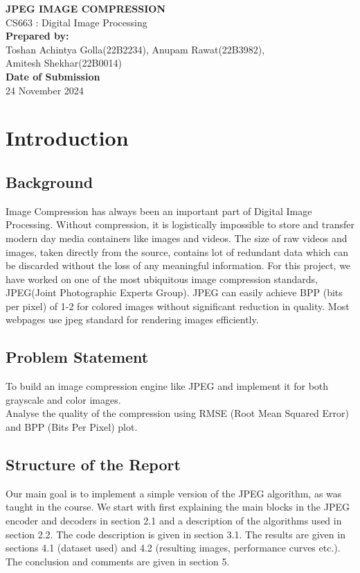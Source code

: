 \documentclass[12pt, a4paper]{report}
\begin{document}
	
	\begin{titlepage}
		\centering
		\vspace*{1.5in}
		{\Huge \textbf{JPEG IMAGE COMPRESSION}} \\[1cm]
		{\Large CS663 : Digital Image Processing} \\[1cm]
		\textbf{Prepared by:} \\[0.25cm]
		Toshan Achintya Golla(22B2234), Anupam Rawat(22B3982),\\ Amitesh Shekhar(22B0014) \\[0.5cm]
		\textbf{Date of Submission}\\[0.25cm]
		24 November 2024 \\[1.5cm]
		\vfill
	\end{titlepage}
	
	

	\tableofcontents
	\newpage
	\chapter{Introduction}
	\section{Background}
	Image Compression has always been an important part of Digital Image Processing. Without compression, it is logistically impossible to store and transfer modern day media containers like images and videos. The size of raw videos and images, taken directly from the source, contains lot of redundant data which can be discarded without the loss of any meaningful information. For this project, we have worked on one of the most ubiquitous image compression standards, JPEG(Joint Photographic Experts Group). JPEG can easily achieve BPP (bits per pixel) of 1-2 for colored images without significant reduction in quality. Most webpages use jpeg standard for rendering images efficiently.
	\section{Problem Statement}
	 To build an image compression engine like JPEG and implement it for both grayscale and color images. \\ Analyse the quality of the compression using RMSE (Root Mean Squared Error) and BPP (Bits Per Pixel) plot.
	 
	\section{Structure of the Report}
	Our main goal is to implement a simple version of the JPEG algorithm, as was taught in the course. We start with first explaining the main blocks in the JPEG encoder and decoders in section 2.1 and a description of the algorithms used in section 2.2. The code description is given in section 3.1. The results are given in sections 4.1 (dataset used) and 4.2 (resulting images, performance curves etc.). The conclusion and comments are given in section 5.
	
\end{document}
